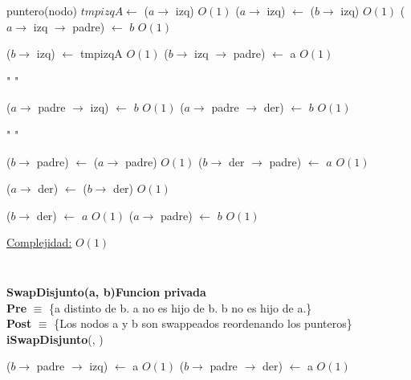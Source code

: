 \begin{Algoritmos}
\begin{algorithm}[H]
\begin{algorithmic}[1]
    \State puntero(nodo) $tmpizqA \gets$ ($a \to$ izq) \Comment $O(1)$
    \State ($a \to$ izq) $\gets$ ($b \to$ izq)  \Comment $O(1)$
        \State ($a \to$ izq $\to$ padre) $\gets$ $b$ \Comment $O(1)$
    \EndIf

    \State ($b \to$ izq) $\gets$ tmpizqA  \Comment $O(1)$
        \State ($b \to$ izq $\to$ padre) $\gets$ a  \Comment $O(1)$
    \EndIf
    
    \State " "

        \State ($a \to$ padre $\to$ izq) $\gets$ $b$ \Comment $O(1)$
    \Else {}
        \State ($a \to$ padre $\to$ der) $\gets$ $b$ \Comment $O(1)$
    \EndIf
    \EndIf
    
    \State " "

    \State ($b \to$ padre) $\gets$ ($a \to$ padre) \Comment $O(1)$
        \State ($b \to$ der $\to$ padre) $\gets$ $a$ \Comment $O(1)$
    \EndIf
    
    \State ($a \to$ der) $\gets$ ($b \to$ der) \Comment $O(1)$
    
    \State ($b \to$ der) $\gets$ $a$ \Comment $O(1)$
    \State ($a \to$ padre) $\gets$ $b$ \Comment $O(1)$

    \medskip
    \Statex \underline{Complejidad:} $O(1)$

\end{algorithmic}
\end{algorithm}

$ $\newline


$ $\newline

\begin{algorithm}[H]
\textbf{SwapDisjunto(a, b)\hspace*{1cm}Funcion privada}\\
\textbf{Pre} $\equiv$ \{a distinto de b. a no es hijo de b. b no es hijo de a.\}\\
\textbf{Post} $\equiv$ \{Los nodos a y b son swappeados reordenando los punteros\}\\
{\textbf{iSwapDisjunto}(, )}
\begin{algorithmic}[1]

        \State ($b \to$ padre $\to$ izq) $\gets$ a \Comment $O(1)$
    \Else {}
        \State ($b \to$ padre $\to$ der) $\gets$ a \Comment $O(1)$
    \EndIf
    \EndIf


\end{algorithmic}
\end{algorithm}
\end{Algoritmos}

